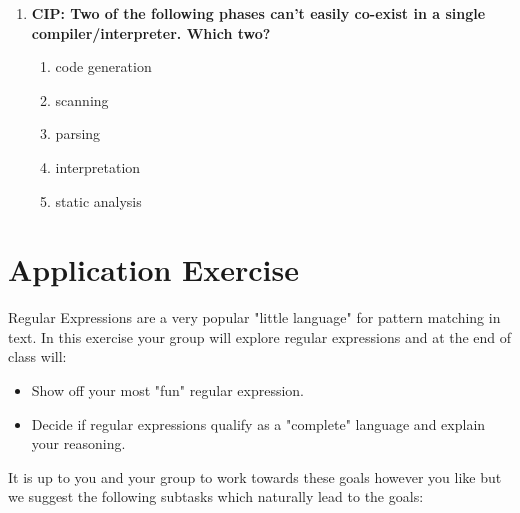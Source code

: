 \documentclass[twoside=false, DIV=14]{scrartcl}
\begin{document}
\begin{enumerate}
\item \textbf{CIP: Two of the following phases can't easily co-exist in a single compiler/interpreter.  Which two?}
\begin{enumerate}
  \item code generation \tick
  \item scanning
  \item parsing
  \item interpretation \tick
  \item static analysis
\end{enumerate}
\end{enumerate}

\newpage
\part*{Application Exercise}
Regular Expressions are a very popular "little language" for pattern matching in text.  In this exercise your group will explore regular expressions and at the end of class will:
\begin{itemize}
  \item Show off your most "fun" regular expression.
  \item Decide if regular expressions qualify as a "complete" language and explain your reasoning.
\end{itemize}
It is up to you and your group to work towards these goals however you like but we suggest the following subtasks which naturally lead to the goals:
\end{document}
